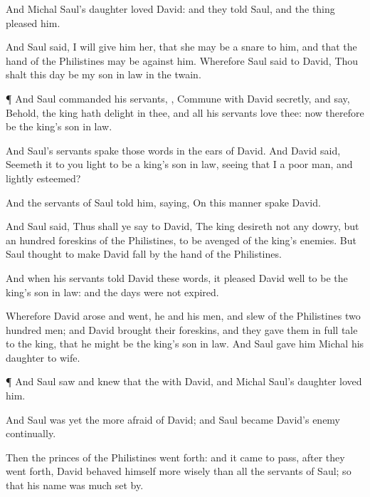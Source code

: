 {And
Michal
Saul’s
daughter
loved
David: and they
told
Saul, and the
thing
pleased him.

And
Saul
said, I will
give him her, that she may be a
snare to him, and that the
hand of the
Philistines may be against him. Wherefore
Saul
said to
David, Thou shalt this
day be my son in
law in
{} the
twain.


\par }{\PP {}¶ And
Saul
commanded his
servants,
{},
Commune with
David
secretly, and
say, Behold, the
king hath
delight in thee, and all his
servants
love thee: now therefore be the
king’s son in
law.

And
Saul’s
servants
spake those
words in the
ears of
David. And
David
said,
Seemeth it to you
{}
light
{} to be a
king’s son in
law, seeing that I
{} a
poor
man, and lightly
esteemed?

And the
servants of
Saul
told him,
saying, On this
manner
spake
David.

And
Saul
said, Thus shall ye
say to
David, The
king
desireth not any
dowry, but an
hundred
foreskins of the
Philistines, to be
avenged of the
king’s
enemies. But
Saul
thought to make
David
fall by the
hand of the
Philistines.

And when his
servants
told
David these
words, it
pleased
David well to be the
king’s son in
law: and the
days were not
expired.

Wherefore
David
arose and
went, he and his
men, and
slew of the
Philistines two
hundred
men; and
David
brought their
foreskins, and they gave them in full
tale to the
king, that he might be the
king’s son in
law. And
Saul
gave him
Michal his
daughter to
wife.


\par }{\PP {}¶ And
Saul
saw and
knew that the
{}
{} with
David, and
{}
Michal
Saul’s
daughter
loved him.

And
Saul was yet the
more
afraid
of
David; and
Saul became
David’s
enemy
continually.

Then the
princes of the
Philistines went
forth: and it came to pass,
after they went
forth,
{}
David behaved himself more
wisely than all the
servants of
Saul; so that his
name was
much set
by.




}
